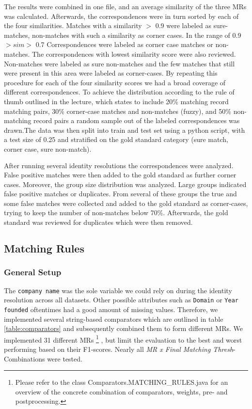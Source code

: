 \documentclass[11pt,titlepage,oneside,openany]{article}
\begin{document}
The results were combined in one file, and an average similarity of the three MRs was calculated. Afterwards, the correspondences were in turn sorted by each of the four similarities. Matches with a similarity $>$ 0.9 were labeled as sure-matches, non-matches with such a similarity as corner cases. In the range of 0.9 $> sim >$ 0.7 Correspondences were labeled as corner case matches or non-matches. The correspondences with lowest similarity score were also reviewed. Non-matches were labeled as sure non-matches and the few matches that still were present in this area were labeled as corner-cases. By repeating this procedure for each of the four similarity scores we had a broad coverage of different correspondences. To achieve the distribution according to the rule of thumb outlined in the lecture, which states to include 20\% matching record matching pairs, 30\% corner-case matches and non-matches (fuzzy), and 50\% non-matching record pairs a random sample out of the labeled correspondences was drawn.The data was then split into train and test set using a python script, with a test size of 0.25 and stratified on the gold standard category (sure match, corner case, sure non-match).

After running several identity resolutions the correspondences were analyzed. False positive matches were then added to the gold standard as further corner cases. Moreover, the group size distribution was analyzed. Large groups indicated false positive matches or duplicates. From several of these groups the true and some false matches were collected and added to the gold standard as corner-cases, trying to keep the number of non-matches below 70\%. Afterwards, the gold standard was reviewed for duplicates which were then removed.

\subsection{Matching Rules}
\label{sec:matching-rules}

\subsubsection{General Setup}
The {\tt company name} was the sole variable we could rely on during the identity resolution across all datasets. Other possible attributes such as {\tt Domain} or {\tt Year founded} oftentimes had a good amount of missing values. Therefore, we implemented several string-based comparators which are outlined in table \ref{table:comparators} and subsequently combined them to form different MRs. We implemented 31 different MRs%
\footnote{Please refer to the class Comparators.MATCHING\_RULES.java for an overview of the concrete combination of comparators, weights, pre- and postprocessing.}%
, but limit the evaluation to the best and worst performing based on their F1-scores. Nearly all \textit{MR x Final Matching Thresh}-Combinations were tested.
\end{document}
